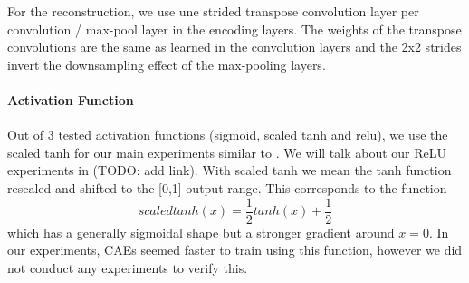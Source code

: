 \documentclass{article}
\begin{document}


    For the reconstruction, we use une strided transpose convolution layer per convolution / max-pool layer in the encoding layers. The weights of the transpose convolutions are the same as learned in the convolution layers and the 2x2 strides invert the downsampling effect of the max-pooling layers.

    \paragraph{Activation Function} Out of 3 tested activation functions (sigmoid, scaled tanh and relu), we use the scaled tanh for our main experiments similar to \citep{masci11}. We will talk about our ReLU experiments in (TODO: add link). With scaled tanh we mean the tanh function rescaled and shifted to the [0,1] output range. This corresponds to the function $$scaledtanh(x) = \frac{1}{2}tanh(x) + \frac{1}{2}$$ which has a generally sigmoidal shape but a stronger gradient around $x = 0$. In our experiments, CAEs seemed faster to train using this function, however we did not conduct any experiments to verify this.
\end{document}
